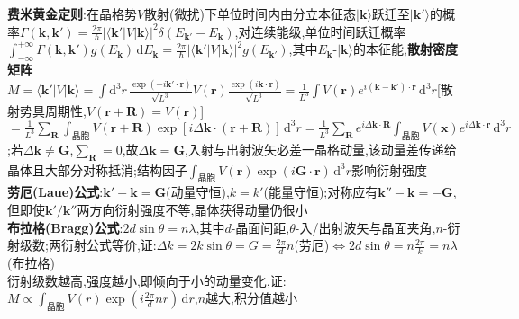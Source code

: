\documentclass[UTF8,10pt,a4paper]{article}
\providecommand{\abs}[1]{\lvert#1\rvert}
\begin{document}
\begin{multicols}{2}
\textbf{费米黄金定则}:在晶格势$V$散射(微扰)下单位时间内由分立本征态$\lvert\bm{k}\rangle$跃迁至$\lvert\bm{k}'\rangle$的概率$\Gamma(\bm{k},\bm{k}')=\frac{2\pi}{\hbar}\abs{\langle\bm{k}'\rvert V\lvert\bm{k}\rangle}^2\delta(E_{\bm{k}'}-E_{\bm{k}})$,对连续能级,单位时间跃迁概率$\int_{-\infty}^{+\infty}\Gamma(\bm{k},\bm{k}')g(E_{\bm{k}})\,\mathrm{d}E_{\bm{k}}=\frac{2\pi}{\hbar}\abs{\langle\bm{k}'\rvert V\lvert\bm{k}\rangle}^2g(E_{\bm{k}'})$,其中$E_{\bm{k}}$-$\lvert\bm{k}\rangle$的本征能,\textbf{散射密度矩阵}$M=\langle\bm{k}'\rvert V\lvert\bm{k}\rangle=\int\mathrm{d}^3r\,\frac{\exp(-i\bm{k}'\cdot\bm{r})}{\sqrt{L^3}}V(\bm{r})\frac{\exp(i\bm{k}\cdot\bm{r})}{\sqrt{L^3}}=\frac{1}{L^3}\int V(\bm{r})e^{i(\bm{k}-\bm{k}')\cdot\bm{r}}\,\mathrm{d}^3r$[散射势具周期性,$V(\bm{r}+\bm{R})=V(\bm{r})$]$=\frac{1}{L^3}\sum_{\bm{R}}\int_{\text{晶胞}}V(\bm{r}+\bm{R})\exp[i\Delta\bm{k}\cdot(\bm{r}+\bm{R})]\,\mathrm{d}^3r=\frac{1}{L^3}\sum_{\bm{R}}e^{i\Delta\bm{k}\cdot\bm{R}}\int_{\text{晶胞}}V(\bm{x})e^{i\Delta\bm{k}\cdot\bm{r}}\,\mathrm{d}^3r$;若$\Delta\bm{k}\neq\bm{G}$,$\sum_{\bm{R}}=0$,故$\Delta\bm{k}=\bm{G}$,入射与出射波矢必差一晶格动量,该动量差传递给晶体且大部分对称抵消;结构因子$\int_{\text{晶胞}}V(\bm{r})\exp(i\bm{G}\cdot\bm{r})\,\mathrm{d}^3r$影响衍射强度\\
\textbf{劳厄(Laue)公式}:$\bm{k}'-\bm{k}=\bm{G}$(动量守恒),$k=k'$(能量守恒);对称应有$\bm{k}''-\bm{k}=-\bm{G}$,但即使$\bm{k}'/\bm{k}''$两方向衍射强度不等,晶体获得动量仍很小\\
\textbf{布拉格(Bragg)公式}:$2d\sin\theta=n\lambda$,其中$d$-晶面间距,$\theta$-入/出射波矢与晶面夹角,$n$-衍射级数;两衍射公式等价,证:$\Delta k=2k\sin\theta=G=\frac{2\pi}{d}n$(劳厄)$\Leftrightarrow 2d\sin\theta=n\frac{2\pi}{k}=n\lambda$(布拉格)\\
衍射级数越高,强度越小,即倾向于小的动量变化,证:$M\propto\int_{\text{晶胞}}V(r)\exp(i\frac{2\pi}{d}nr)\,\mathrm{d}r$,$n$越大,积分值越小\\

\end{multicols}
\end{document}

